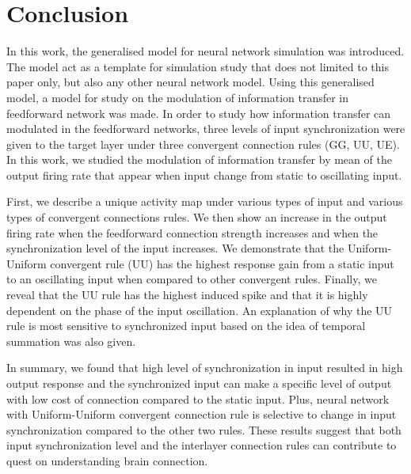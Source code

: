 \chapter{Conclusion}

In this work, the generalised model for neural network simulation was introduced.  The model act as a template for simulation study that does not limited to this paper only, but also any other neural network model. Using this generalised model, a model for study on the modulation of information transfer in feedforward network was made. 
In order to study how information transfer can modulated in the feedforward networks, three levels of input synchronization were given to the target layer under three convergent connection rules (GG, UU, UE).  In this work, we studied the modulation of information transfer by mean of the output firing rate that appear when input change from static to oscillating input.

First, we describe a unique activity map under various types of input and various types of convergent connections rules. We then show an increase in the output firing rate when the feedforward connection strength increases and when the synchronization level of the input increases. We demonstrate that the Uniform-Uniform convergent rule (UU) has the highest response gain from a static input to an oscillating input when compared to other convergent rules. Finally, we reveal that the UU rule has the highest induced spike and that it is highly dependent on the phase of the input oscillation. An explanation of why the UU rule is most sensitive to synchronized input based on the idea of temporal summation was also given.


In summary, we found that high level of synchronization in input resulted in high output response and the synchronized input can make a specific level of output with low cost of connection compared to the static input. Plus, neural network with Uniform-Uniform convergent connection rule is selective to change in input synchronization compared to the other two rules. These results suggest that both input synchronization level and the interlayer connection rules  can contribute to quest on understanding brain connection. 

\paragraph{} 

